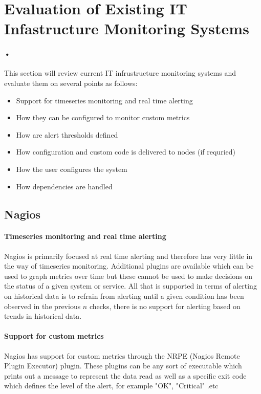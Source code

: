 \documentclass[10pt]{article}
\begin{document}
	\section{Evaluation of Existing IT Infastructure Monitoring Systems}
		\paragraph{•}
		This section will review current IT infrustructure monitoring systems and evaluate them on
		several points as follows:
		\begin{itemize}
			\item Support for timeseries monitoring and real time alerting
			\item How they can be configured to monitor custom metrics
			\item How are alert thresholds defined
			\item How configuration and custom code is delivered to nodes (if requried)
			\item How the user configures the system
			\item How dependencies are handled
		\end{itemize}
	
	\subsection{Nagios}
	\paragraph{Timeseries monitoring and real time alerting}
	Nagios is primarily focused at real time alerting and therefore has very little in the way of 
	timeseries monitoring.  Additional plugins are available which can be used to graph metrics
	over time but these cannot be used to make decisions on the status of a given system or service.
	All that is supported in terms of alerting on historical data is to refrain from alerting until
	a given condition has been observed in the previous $n$ checks, there is no support for alerting
	based on trends in historical data.
	
	\paragraph{Support for custom metrics}
	Nagios has support for custom metrics through the NRPE (Nagios Remote Plugin Executor) plugin.
	These plugins can be any sort of executable which prints out a message to represent the data read
	as well as a specific exit code which defines the level of the alert, for example "OK", "Critical"
	.etc
	
\end{document}

